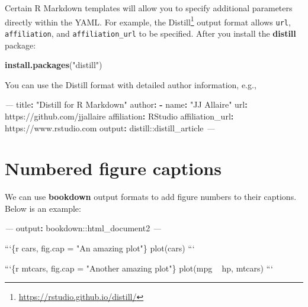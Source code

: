 \documentclass[
  11pt,
]{krantz}
\newenvironment{Shaded}{\begin{snugshade}}{\end{snugshade}}
\newcommand{\AttributeTok}[1]{\textcolor[rgb]{0.61,0.61,0.61}{#1}}
\newcommand{\BaseNTok}[1]{\textcolor[rgb]{0.06,0.06,0.06}{#1}}
\newcommand{\FunctionTok}[1]{\textcolor[rgb]{0,0,0}{#1}}
\newcommand{\KeywordTok}[1]{\textcolor[rgb]{0.27,0.27,0.27}{\textbf{#1}}}
\newcommand{\NormalTok}[1]{#1}
\newcommand{\PreprocessorTok}[1]{\textcolor[rgb]{0.37,0.37,0.37}{\textit{#1}}}
\newcommand{\StringTok}[1]{\textcolor[rgb]{0.5,0.5,0.5}{#1}}
\renewcommand{\href}[2]{#2\footnote{\url{#1}}}
\begin{document}
Certain R Markdown templates will allow you to specify additional parameters directly within the YAML. For example, the \href{https://rstudio.github.io/distill/}{Distill} output format allows \texttt{url}, \texttt{affiliation}, and \texttt{affiliation\_url} to be specified. After you install the \textbf{distill} package:

\begin{Shaded}
\begin{Highlighting}[]
\KeywordTok{install.packages}\NormalTok{(}\StringTok{"distill"}\NormalTok{)}
\end{Highlighting}
\end{Shaded}

You can use the Distill format with detailed author information, e.g.,

\begin{Shaded}
\begin{Highlighting}[]
\PreprocessorTok{---}
\FunctionTok{title}\KeywordTok{:}\AttributeTok{ }\StringTok{"Distill for R Markdown"}
\FunctionTok{author}\KeywordTok{:}
\AttributeTok{  }\KeywordTok{-}\AttributeTok{ }\FunctionTok{name}\KeywordTok{:}\AttributeTok{ }\StringTok{"JJ Allaire"}
\AttributeTok{    }\FunctionTok{url}\KeywordTok{:}\AttributeTok{ https://github.com/jjallaire}
\AttributeTok{    }\FunctionTok{affiliation}\KeywordTok{:}\AttributeTok{ RStudio}
\AttributeTok{    }\FunctionTok{affiliation_url}\KeywordTok{:}\AttributeTok{ https://www.rstudio.com}
\FunctionTok{output}\KeywordTok{:}\AttributeTok{ distill::distill_article}
\PreprocessorTok{---}
\end{Highlighting}
\end{Shaded}

\hypertarget{figure-number}{%
\section{Numbered figure captions}\label{figure-number}}

We can use \textbf{bookdown} output formats to add figure numbers to their captions. Below is an example:

\begin{Shaded}
\begin{Highlighting}[]
\PreprocessorTok{---}
\FunctionTok{output}\KeywordTok{:}\AttributeTok{ bookdown::html_document2}
\PreprocessorTok{---}
\end{Highlighting}
\end{Shaded}

\begin{Shaded}
\begin{Highlighting}[]
\BaseNTok{```\{r cars, fig.cap = "An amazing plot"\}}
\BaseNTok{plot(cars)}
\BaseNTok{```}

\BaseNTok{```\{r mtcars, fig.cap = "Another amazing plot"\}}
\BaseNTok{plot(mpg ~ hp, mtcars)}
\BaseNTok{```}
\end{Highlighting}
\end{Shaded}
\end{document}
